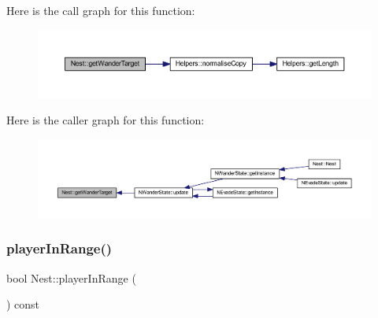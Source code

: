Here is the call graph for this function\+:
\nopagebreak
\begin{figure}[H]
\begin{center}
\leavevmode
\includegraphics[width=350pt]{class_nest_a7cf537ca64aef6173067915a15e0cdec_cgraph}
\end{center}
\end{figure}
Here is the caller graph for this function\+:
\nopagebreak
\begin{figure}[H]
\begin{center}
\leavevmode
\includegraphics[width=350pt]{class_nest_a7cf537ca64aef6173067915a15e0cdec_icgraph}
\end{center}
\end{figure}
\mbox{\label{class_nest_a2a6648d13e1eb6b8634f6f0b618d6da3}} 
\subsubsection{\texorpdfstring{player\+In\+Range()}{playerInRange()}}
{\footnotesize\ttfamily bool Nest\+::player\+In\+Range (\begin{DoxyParamCaption}{ }\end{DoxyParamCaption}) const}

